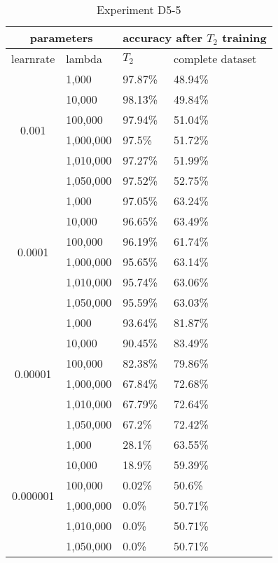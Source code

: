 \begin{table}[H]
    \centering
    \begin{tabular}{ |c|l|l|l|  }
        \hline
        \multicolumn{2}{|c|}{parameters} & \multicolumn{2}{c|}{accuracy after $T_2$ training} \\
        \hline
        learnrate & lambda & $T_2$ & complete dataset\\
        \hline
        \hline
        \multirow{6}{*}{0.001} & 1,000 & 97.87\% & 48.94\%\\
                            & 10,000 & 98.13\% & 49.84\%\\
                            & 100,000 & 97.94\% & 51.04\% \\
                            & 1,000,000 & 97.5\% & 51.72\% \\
                            & 1,010,000 & 97.27\% & 51.99\% \\
                            & 1,050,000 & 97.52\% & 52.75\% \\
        \hline
        \multirow{6}{*}{0.0001} & 1,000 & 97.05\% & 63.24\%\\
                                & 10,000 & 96.65\% & 63.49\%\\
                                & 100,000 & 96.19\% & 61.74\% \\
                                & 1,000,000 & 95.65\% & 63.14\% \\
                                & 1,010,000 & 95.74\% & 63.06\% \\
                                & 1,050,000 & 95.59\% & 63.03\% \\
        \hline
        \multirow{6}{*}{0.00001} & 1,000 & 93.64\% & 81.87\%\\
                                & 10,000 & 90.45\% & 83.49\%\\
                                & 100,000 & 82.38\% & 79.86\% \\
                                & 1,000,000 & 67.84\% & 72.68\% \\
                                & 1,010,000 & 67.79\% & 72.64\% \\
                                & 1,050,000 & 67.2\% & 72.42\% \\
        \hline
        \multirow{6}{*}{0.000001} & 1,000 & 28.1\% & 63.55\% \\
                                & 10,000 & 18.9\% & 59.39\% \\
                                & 100,000 & 0.02\% & 50.6\% \\
                                & 1,000,000 & 0.0\% & 50.71\% \\
                                & 1,010,000 & 0.0\% & 50.71\% \\
                                & 1,050,000 & 0.0\% & 50.71\% \\
        \hline
    \end{tabular}
    \caption{Experiment D5-5}
    \label{table:exp_d5-5}
\end{table}

